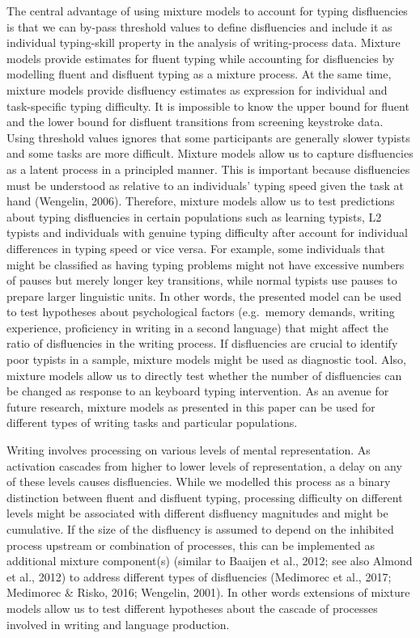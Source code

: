 \documentclass[
  english,
  man,mask,floatsintext]{apa7}
\begin{document}
The central advantage of using mixture models to account for typing disfluencies is that we can by-pass threshold values to define disfluencies and include it as individual typing-skill property in the analysis of writing-process data. Mixture models provide estimates for fluent typing while accounting for disfluencies by modelling fluent and disfluent typing as a mixture process. At the same time, mixture models provide disfluency estimates as expression for individual and task-specific typing difficulty. It is impossible to know the upper bound for fluent and the lower bound for disfluent transitions from screening keystroke data. Using threshold values ignores that some participants are generally slower typists and some tasks are more difficult. Mixture models allow us to capture disfluencies as a latent process in a principled manner. This is important because disfluencies must be understood as relative to an individuals' typing speed given the task at hand (Wengelin, 2006). Therefore, mixture models allow us to test predictions about typing disfluencies in certain populations such as learning typists, L2 typists and individuals with genuine typing difficulty after account for individual differences in typing speed or vice versa. For example, some individuals that might be classified as having typing problems might not have excessive numbers of pauses but merely longer key transitions, while normal typists use pauses to prepare larger linguistic units. In other words, the presented model can be used to test hypotheses about psychological factors (e.g.~memory demands, writing experience, proficiency in writing in a second language) that might affect the ratio of disfluencies in the writing process. If disfluencies are crucial to identify poor typists in a sample, mixture models might be used as diagnostic tool. Also, mixture models allow us to directly test whether the number of disfluencies can be changed as response to an keyboard typing intervention. As an avenue for future research, mixture models as presented in this paper can be used for different types of writing tasks and particular populations.

Writing involves processing on various levels of mental representation. As activation cascades from higher to lower levels of representation, a delay on any of these levels causes disfluencies. While we modelled this process as a binary distinction between fluent and disfluent typing, processing difficulty on different levels might be associated with different disfluency magnitudes and might be cumulative. If the size of the disfluency is assumed to depend on the inhibited process upstream or combination of processes, this can be implemented as additional mixture component(s) (similar to Baaijen et al., 2012; see also Almond et al., 2012) to address different types of disfluencies (Medimorec et al., 2017; Medimorec \& Risko, 2016; Wengelin, 2001). In other words extensions of mixture models allow us to test different hypotheses about the cascade of processes involved in writing and language production.
\end{document}
